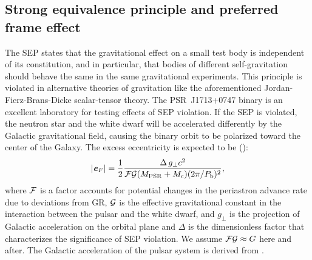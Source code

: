 \subsection{Strong equivalence principle and preferred frame effect}
\label{sec:sep}
The SEP states that the gravitational
effect on a small test body is independent of its constitution, and in
particular, that bodies of different self-gravitation should behave the same in
the same gravitational experiments. This principle is violated in alternative
theories of gravitation like the aforementioned Jordan-Fierz-Brans-Dicke
scalar-tensor theory. The PSR~J1713+0747 binary is an excellent laboratory for testing 
effects of SEP violation. If the SEP is violated, the neutron star and the white
dwarf will be accelerated differently by the Galactic gravitational field, causing
the binary orbit to be polarized toward the center of the Galaxy. The excess 
eccentricity is expected to be (\citealt{ds91}):
\begin{equation}
|\textbf{\textit{e}}_F| = \frac{1}{2}\frac{\Delta\, g_{\bot}
  c^2}{\msF\msG(M_{\rm PSR}+M_{\rm
c})(2\pi/P_{\rm b})^2},
\end{equation}
where $\mathcal{F}$ is a factor accounts for potential changes in the periastron advance rate
due to deviations from GR, $\mathcal{G}$ is the effective gravitational constant in the interaction
between the pulsar and the white dwarf, and $g_{\bot}$ is the projection of Galactic acceleration on the orbital plane 
and $\Delta$ is the dimensionless factor that characterizes the significance 
of SEP violation. We assume $\mathcal{F}\mathcal{G}\approx G$ here and after.
The Galactic acceleration of the pulsar system is derived from \citet{hf04a, rmb+14}.

